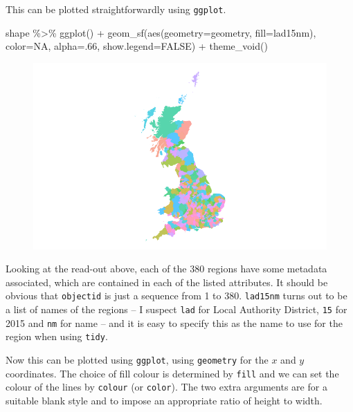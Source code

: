 \documentclass[
  letterpaper,
]{book}
\newenvironment{Shaded}{\begin{snugshade}}{\end{snugshade}}
\newcommand{\AttributeTok}[1]{\textcolor[rgb]{0.40,0.45,0.13}{#1}}
\newcommand{\ConstantTok}[1]{\textcolor[rgb]{0.56,0.35,0.01}{#1}}
\newcommand{\DecValTok}[1]{\textcolor[rgb]{0.68,0.00,0.00}{#1}}
\newcommand{\FunctionTok}[1]{\textcolor[rgb]{0.28,0.35,0.67}{#1}}
\newcommand{\NormalTok}[1]{\textcolor[rgb]{0.00,0.23,0.31}{#1}}
\newcommand{\SpecialCharTok}[1]{\textcolor[rgb]{0.37,0.37,0.37}{#1}}
\begin{document}
This can be plotted straightforwardly using \texttt{ggplot}.

\begin{Shaded}
\begin{Highlighting}[]
\NormalTok{shape }\SpecialCharTok{\%\textgreater{}\%}
  \FunctionTok{ggplot}\NormalTok{() }\SpecialCharTok{+}
  \FunctionTok{geom\_sf}\NormalTok{(}\FunctionTok{aes}\NormalTok{(}\AttributeTok{geometry=}\NormalTok{geometry, }\AttributeTok{fill=}\NormalTok{lad15nm), }
          \AttributeTok{color=}\ConstantTok{NA}\NormalTok{, }\AttributeTok{alpha=}\NormalTok{.}\DecValTok{66}\NormalTok{, }\AttributeTok{show.legend=}\ConstantTok{FALSE}\NormalTok{) }\SpecialCharTok{+}
  \FunctionTok{theme\_void}\NormalTok{()}
\end{Highlighting}
\end{Shaded}

\begin{figure}[H]

{\centering \includegraphics{./Maps_files/figure-pdf/map0a-1.pdf}

}

\end{figure}

Looking at the read-out above, each of the 380 regions have some
metadata associated, which are contained in each of the listed
attributes. It should be obvious that \texttt{objectid} is just a
sequence from 1 to 380. \texttt{lad15nm} turns out to be a list of names
of the regions -- I suspect \texttt{lad} for Local Authority District,
\texttt{15} for 2015 and \texttt{nm} for name -- and it is easy to
specify this as the name to use for the region when using \texttt{tidy}.

Now this can be plotted using \texttt{ggplot}, using \texttt{geometry}
for the \(x\) and \(y\) coordinates. The choice of fill colour is
determined by \texttt{fill} and we can set the colour of the lines by
\texttt{colour} (or \texttt{color}). The two extra arguments are for a
suitable blank style and to impose an appropriate ratio of height to
width.
\end{document}
